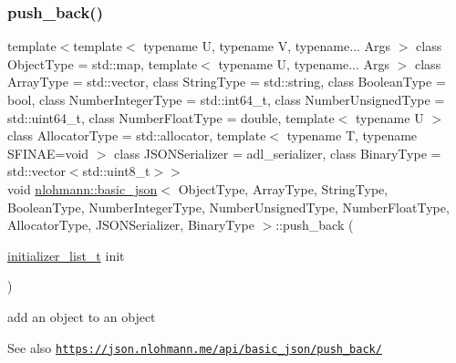 \subsubsection{\texorpdfstring{push\+\_\+back()}{push\_back()}\hspace{0.1cm}{\footnotesize\ttfamily [4/4]}}
{\footnotesize\ttfamily template$<$template$<$ typename U, typename V, typename... Args $>$ class Object\+Type = std\+::map, template$<$ typename U, typename... Args $>$ class Array\+Type = std\+::vector, class String\+Type  = std\+::string, class Boolean\+Type  = bool, class Number\+Integer\+Type  = std\+::int64\+\_\+t, class Number\+Unsigned\+Type  = std\+::uint64\+\_\+t, class Number\+Float\+Type  = double, template$<$ typename U $>$ class Allocator\+Type = std\+::allocator, template$<$ typename T, typename S\+F\+I\+N\+A\+E=void $>$ class J\+S\+O\+N\+Serializer = adl\+\_\+serializer, class Binary\+Type  = std\+::vector$<$std\+::uint8\+\_\+t$>$$>$ \\
void \hyperlink{classnlohmann_1_1basic__json}{nlohmann\+::basic\+\_\+json}$<$ Object\+Type, Array\+Type, String\+Type, Boolean\+Type, Number\+Integer\+Type, Number\+Unsigned\+Type, Number\+Float\+Type, Allocator\+Type, J\+S\+O\+N\+Serializer, Binary\+Type $>$\+::push\+\_\+back (\begin{DoxyParamCaption}\item[{\hyperlink{classnlohmann_1_1basic__json_ac569f292a070dfd2f6b69c16e746095a}{initializer\+\_\+list\+\_\+t}}]{init }\end{DoxyParamCaption})\hspace{0.3cm}{\ttfamily [inline]}}



add an object to an object 

\begin{DoxySeeAlso}{See also}
\href{https://json.nlohmann.me/api/basic_json/push_back/}{\tt https\+://json.\+nlohmann.\+me/api/basic\+\_\+json/push\+\_\+back/} 
\end{DoxySeeAlso}
\mbox{\label{classnlohmann_1_1basic__json_aff8e38cd973bc94557fa8d36433c0e4c}} 
